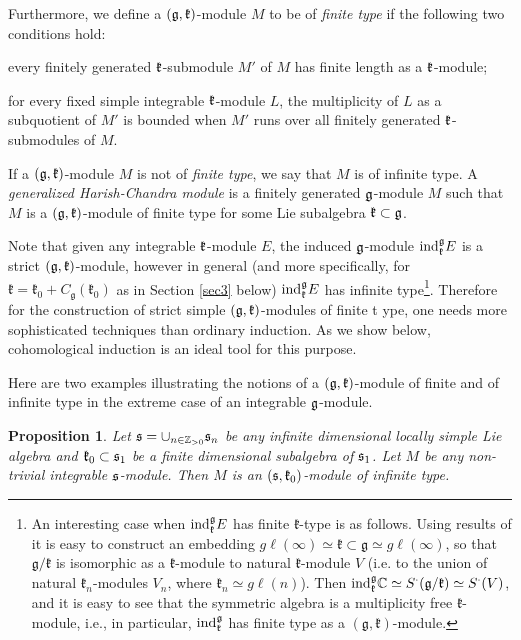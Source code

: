 \documentclass[12pt]{article}
\newcounter{theorem}
\newtheorem{prop}[theo]{Proposition}
\newcommand {\ZZ} {\mathbb {Z}}
\newcommand {\CC} {\mathbb {C}}
\newcommand{\kk}{\mathfrak{k}}
\renewcommand{\gg}{\mathfrak{g}}
\newcommand{\refsec}[1]{Section \ref{#1}}
\newcommand{\gl}{{g\ell}}
\newcommand{\ind}{\mathrm{ind}}
\def\ind{\text{\rm ind}}
\begin{document}
Furthermore, we define a $(\frak g,\frak k)$-module $M$ to be of {\it finite type} if the following two conditions hold:

\item[-] every finitely generated $\frak k$-submodule $M'$ of $M$ has finite length as a $\frak k$-module;
\item[-] for every fixed simple integrable $\frak k$-module $L$, the multiplicity of $L$ as a subquotient of $M'$ is bounded when $M'$ runs over all finitely generated $\frak k$-submodules of $M$. 

If a $(\frak g,\frak k)$-module $M$ is not of {\it finite type}, we say that $M$ is of infinite type.  A {\it generalized Harish-Chandra module} is a finitely generated $\frak g$-module $M$ such that $M$ is a $(\frak g,\frak k)$-module of finite type for some Lie subalgebra $\frak k\subset\frak g$.

Note that given any integrable $\frak k$-module $E$, the induced $\frak g$-module $\text{ind}^{\frak g}_{\frak k} E$ is a strict $(\frak g, \frak k)$-module, however in general (and more specifically, for $\kk=\kk_0+C_\gg(\kk_0)$ as in \refsec{sec3} below) $\text{ind}^{\frak g}_{\frak k} E$ has infinite type\footnote{An interesting case when $\ind_\kk^\gg E$ has finite $\kk$-type is as follows. Using results of \cite{NP} it is easy to construct an embedding $\gl(\infty)\simeq\kk\subset\gg\simeq\gl(\infty)$, so that $\gg/\kk$ is isomorphic as a $\kk$-module to natural $\kk$-module $V$ (i.e. to the union of natural $\kk_n$-modules $V_n$, where $\kk_n\simeq\gl(n)$). Then  $\ind_\kk^\gg\CC\simeq S^\cdot(\gg/\kk)\simeq S^\cdot(V)$, and it is easy to see that the symmetric algebra is a multiplicity free $\kk$-module, i.e., in particular, $\ind_\kk^\gg$ has finite type as a $(\gg,\kk)$-module.}.  Therefore for the construction of strict simple $(\frak g,\frak k)$-modules of finite t ype, one needs more sophisticated techniques than ordinary induction. As we show below, cohomological induction is an ideal tool for this purpose.

Here are two examples illustrating the notions of a $(\frak g,\frak k)$-module of finite and of infinite type in the extreme case of an integrable $\frak g$-module.

\begin{prop}\label{prop13}  Let $\frak s = \cup_{n\in\ZZ_{>0}}\frak
s_n$ be any infinite dimensional locally simple Lie algebra and $\frak k_0 \subset\frak s_1$ be a finite dimensional subalgebra of $\frak s_1$.  Let $M$ be any non-trivial integrable $\frak s$-module.  Then $M$ is an $(\frak s,\frak k_0)$-module of infinite type.
\end{prop}
\end{document}
